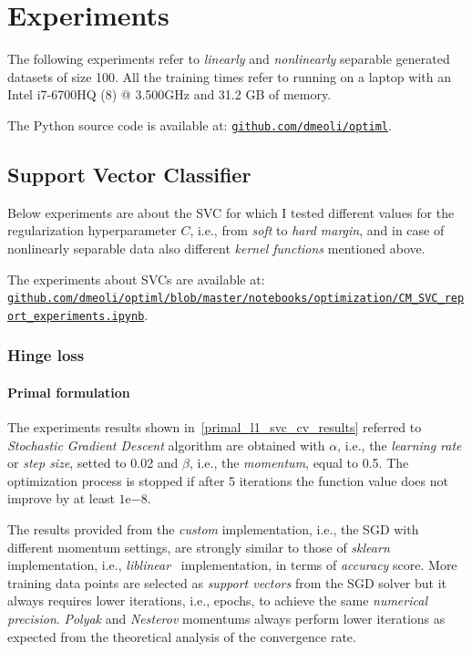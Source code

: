 \section{Experiments}

The following experiments refer to \emph{linearly} and \emph{nonlinearly} separable generated datasets of size 100. All the training times refer to running on a laptop with an Intel i7-6700HQ (8) @ 3.500GHz and 31.2 GB of memory.

The Python source code is available at: \href{https://github.com/dmeoli/optiml}{\texttt{github.com/dmeoli/optiml}}.

\subsection{Support Vector Classifier}

Below experiments are about the SVC for which I tested different values for the regularization hyperparameter $C$, i.e., from \emph{soft} to \emph{hard margin}, and in case of nonlinearly separable data also different \emph{kernel functions} mentioned above.

The experiments about SVCs are available at: \\ \href{https://github.com/dmeoli/optiml/blob/master/notebooks/optimization/CM_SVC_report_experiments.ipynb}{\texttt{github.com/dmeoli/optiml/blob/master/notebooks/optimization/CM\_SVC\_report\_experiments.ipynb}}.

\subsubsection{Hinge loss}

\paragraph{Primal formulation}

The experiments results shown in~\ref{primal_l1_svc_cv_results} referred to \emph{Stochastic Gradient Descent} algorithm are obtained with $\alpha$, i.e., the \emph{learning rate} or \emph{step size}, setted to 0.02 and $\beta$, i.e., the \emph{momentum}, equal to 0.5. The optimization process is stopped if after 5 iterations the function value does not improve by at least $1\mathrm{e}{-8}$.



The results provided from the \emph{custom} implementation, i.e., the SGD with different momentum settings, are strongly similar to those of \emph{sklearn} implementation, i.e., \emph{liblinear}~\cite{fan2008liblinear} implementation, in terms of \emph{accuracy} score. More training data points are selected as \emph{support vectors} from the SGD solver but it always requires lower iterations, i.e., epochs, to achieve the same \emph{numerical precision}. \emph{Polyak} and \emph{Nesterov} momentums always perform lower iterations as expected from the theoretical analysis of the convergence rate.

